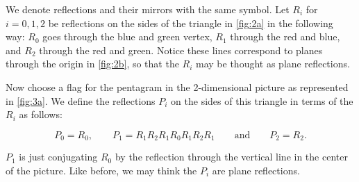 \documentclass{article}
\theoremstyle{definition}
\begin{document}
	We denote reflections and their mirrors with the same symbol. Let $R_i$ for $i=0,1,2$ be reflections on the sides of the triangle in \cref{fig:2a} in the following way: $R_0$ goes through the blue and green vertex, $R_1$ through the red and blue, and $R_2$ through the red and green. Notice these lines correspond to planes through the origin in \cref{fig:2b}, so that the $R_i$ may be thought as plane reflections.
	
	Now choose a flag for the pentagram in the 2-dimensional picture as represented in \cref{fig:3a}. We define the reflections $P_i$ on the sides of this triangle in terms of the $R_i$ as follows:
	
	\[P_0=R_0,\qquad P_1=R_1R_2R_1R_0R_1R_2R_1\qquad\text{and}\qquad P_2=R_2.\]
	
	$P_1$ is just conjugating $R_0$ by the reflection through the vertical line in the center of the picture. Like before, we may think the $P_i$ are plane reflections.
	
\end{document}
